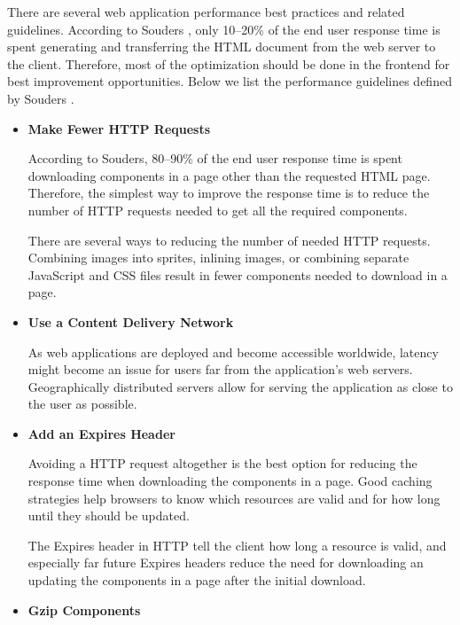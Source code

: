 There are several web application performance best practices and
related guidelines. According to Souders \cite{souders2007high}, only
10--20\% of the end user response time is spent generating and
transferring the HTML document from the web server to the
client. Therefore, most of the optimization should be done in the
frontend for best improvement opportunities. Below we list the
performance guidelines defined by Souders \cite{souders2007high,
  souders2009even}.

\begin{itemize}


\item \textbf{Make Fewer HTTP Requests}

  According to Souders, 80--90\% of the end user response time is
  spent downloading components in a page other than the requested HTML
  page. Therefore, the simplest way to improve the response time is to
  reduce the number of HTTP requests needed to get all the required
  components.

  There are several ways to reducing the number of needed HTTP
  requests. Combining images into sprites, inlining images, or
  combining separate JavaScript and CSS files result in fewer
  components needed to download in a page.

\item \textbf{Use a Content Delivery Network}

  As web applications are deployed and become accessible worldwide,
  latency might become an issue for users far from the application's
  web servers. Geographically distributed servers allow for serving
  the application as close to the user as possible.

\item \textbf{Add an Expires Header}

  Avoiding a HTTP request altogether is the best option for reducing
  the response time when downloading the components in a page. Good
  caching strategies help browsers to know which resources are valid
  and for how long until they should be updated.

  The Expires header in HTTP tell the client how long a resource is
  valid, and especially far future Expires headers reduce the need for
  downloading an updating the components in a page after the initial
  download.

\item \textbf{Gzip Components}


\end{itemize}
